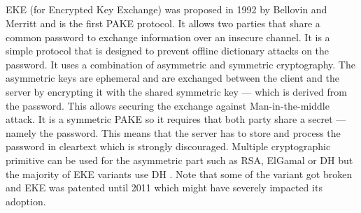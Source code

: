 ﻿\documentclass[../report.tex]{subfiles}
\begin{document}
\subsection{}
\paragraph{}
EKE (for Encrypted Key Exchange) was proposed in 1992 by Bellovin and Merritt \cite{EKE_Paper} and is the first PAKE protocol. 
It allows two parties that share a common password to exchange information over an insecure channel.
It is a simple protocol that is designed to prevent offline dictionary attacks on the password.
It uses a combination of asymmetric and symmetric cryptography.
The asymmetric keys are ephemeral and are exchanged between the client and the server by encrypting it with the shared symmetric key --- which is derived from the password.
This allows securing the exchange against Man-in-the-middle attack. %
It is a symmetric PAKE so it requires that both party share a secret --- namely the password. This means that the server has to store and process the password in cleartext which is strongly discouraged. %
Multiple cryptographic primitive can be used for the asymmetric part such as RSA, ElGamal or DH but the majority of EKE variants use DH \cite{Breaking_EKE}. %
Note that some of the variant got broken and 
EKE was patented until 2011 which might have severely impacted its adoption.

\paragraph{}
\end{document}
